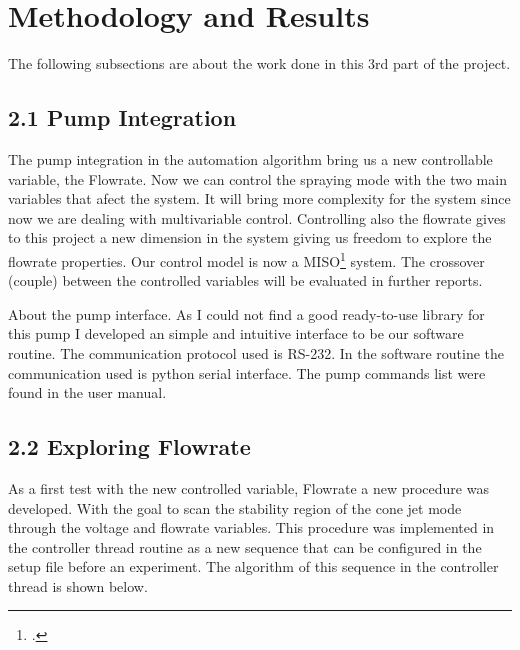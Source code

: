 \section{Methodology and Results}

    The following subsections are about the work done in this 3rd part of the project.


\subsection*{2.1 Pump Integration}

    The pump integration in the automation algorithm bring us a new controllable variable, the Flowrate. Now we can control the spraying mode with the
    two main variables that afect the system. 
    It will bring more complexity for the system since now we are dealing with multivariable control.
    Controlling also the flowrate gives to this project a new dimension in the system giving us freedom to explore the flowrate properties.
    Our control model is now a MISO\footcite{MISO: Multiple Inputs Single Output} system. The crossover (couple) between the controlled variables will be evaluated in further reports.

    About the pump interface. As I could not find a good ready-to-use library for this pump I developed an simple and intuitive interface to be our software routine.
    The communication protocol used is RS-232. In the software routine the communication used is python serial interface. The pump commands list were found in the user manual.


\subsection*{2.2 Exploring Flowrate}

    As a first test with the new controlled variable, Flowrate a new procedure was developed. With the goal to scan the stability region of the cone jet mode through the voltage and flowrate variables.
    This procedure was implemented in the controller thread routine as a new sequence that can be configured in the setup file before an experiment.
    The algorithm of this sequence in the controller thread is shown below.


